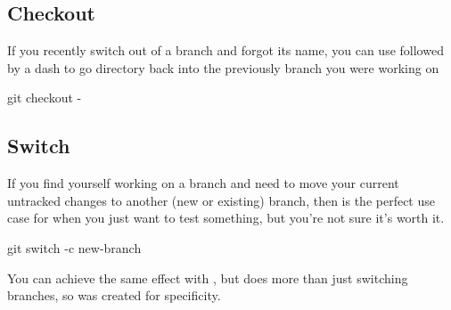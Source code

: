 \subsection{Checkout}

If you recently switch out of a branch and forgot its name, you can use  followed by a dash to go directory back into the previously branch you were working on

\begin{git-bash}
    git checkout -
\end{git-bash}



\subsection{Switch}

If you find yourself working on a branch and need to move your current untracked changes to another (new or existing) branch, then  is the perfect use case for when you just want to test something, but you're not sure it's worth it.

\begin{git-bash}
    git switch -c new-branch
\end{git-bash}

You can achieve the same effect with , but  does more than just switching branches, so  was created for specificity.



